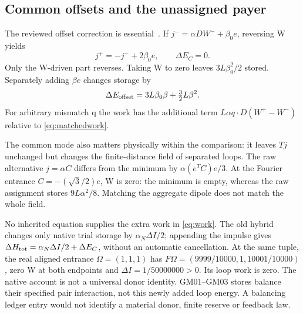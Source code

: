 \subsection{Common offsets and the unassigned payer}
The reviewed offset correction is essential~\cite[section 4, corrected]{GM05}. If
\(j^-=\alpha DW^-+\beta_0e\), reversing W yields
\begin{equation}\label{eq:offsetreversal}
j^+=-j^-+2\beta_0e,\qquad \Delta E_C=0.
\end{equation}
Only the W-driven part reverses. Taking W to zero leaves \(3L\beta_0^2/2\) stored. Separately adding \(\beta e\) changes storage by
\begin{equation}\label{eq:offsetwork}
\Delta E_{\rm offset}=3L\beta_0\beta+\tfrac32L\beta^2.
\end{equation}
For arbitrary mismatch q the work has the additional term
\(L\alpha q\cdot D(W^+-W^-)\) relative to \eqref{eq:matchedwork}.

The common mode also matters physically within the comparison: it leaves \(Tj\) unchanged but changes the finite-distance field of separated loops. The raw alternative \(j=\alpha C\) differs from the minimum by \(\alpha(e^TC)e/3\). At the Fourier entrance \(C=-(\sqrt3/2)e\), W is zero: the minimum is empty, whereas the raw assignment stores \(9L\alpha^2/8\). Matching the aggregate dipole does not match the whole field.

No inherited equation supplies the extra work in \eqref{eq:work}. The old hybrid changes only native trial storage by \(\alpha_N\Delta I/2\); appending the impulse gives \(\Delta H_{\rm tot}=\alpha_N\Delta I/2+\Delta E_C\), without an automatic cancellation. At the same tuple, the real aligned entrance \(\Omega=(1,1,1)\) has \(F\Omega=(9999/10000,1,10001/10000)\), zero W at both endpoints and \(\Delta I=1/50000000>0\). Its loop work is zero. The native account is not a universal donor identity. GM01--GM03 stores balance their specified pair interaction, not this newly added loop energy. A balancing ledger entry would not identify a material donor, finite reserve or feedback law.
